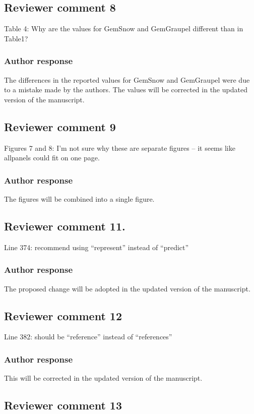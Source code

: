 \documentclass[11pt]{scrartcl}
\begin{document}
\subsection*{Reviewer comment 8}
Table 4: Why are the values for GemSnow and GemGraupel different than in Table1?

\subsubsection*{Author response}

The differences in the reported values for GemSnow and GemGraupel were due to a mistake
made by the authors. The values will be corrected in the updated version of the manuscript.

\subsection*{Reviewer comment 9}
Figures 7 and 8:  I’m not sure why these are separate figures – it seems like allpanels could fit on one page.

\subsubsection*{Author response}
The figures will be combined into a single figure.

\subsection*{Reviewer comment 11.}
 Line 374: recommend using “represent” instead of “predict”

\subsubsection*{Author response}
The proposed change will be adopted in the updated version of the manuscript.

\subsection*{Reviewer comment 12}
 Line 382: should be “reference” instead of “references”

\subsubsection*{Author response}
This will be corrected in the updated version of the manuscript.

\subsection*{Reviewer comment 13}
\end{document}
